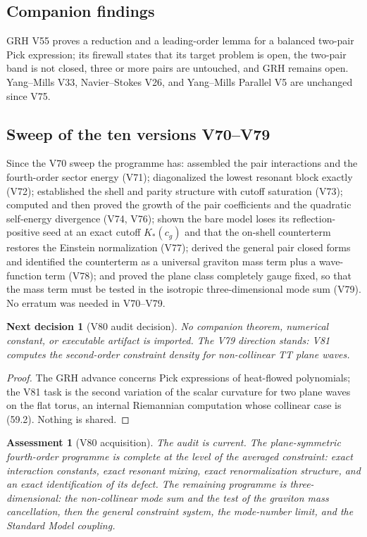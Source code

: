 \documentclass[11pt]{article}
\newtheorem{decision}[theorem]{Next decision}
\newtheorem{assessment}[theorem]{Assessment}
\theoremstyle{remark}
\begin{document}
\subsection{Companion findings}

GRH V55 proves a reduction and a leading-order lemma for a balanced
two-pair Pick expression; its firewall states that its target problem
is open, the two-pair band is not closed, three or more pairs are
untouched, and GRH remains open.  Yang--Mills V33, Navier--Stokes V26,
and Yang--Mills Parallel V5 are unchanged since V75.

\subsection{Sweep of the ten versions V70--V79}

Since the V70 sweep the programme has: assembled the pair interactions
and the fourth-order sector energy (V71); diagonalized the lowest
resonant block exactly (V72); established the shell and parity
structure with cutoff saturation (V73); computed and then proved the
growth of the pair coefficients and the quadratic self-energy
divergence (V74, V76); shown the bare model loses its
reflection-positive seed at an exact cutoff \(K_*(c_g)\) and that the
on-shell counterterm restores the Einstein normalization (V77); derived
the general pair closed forms and identified the counterterm as a
universal graviton mass term plus a wave-function term (V78); and
proved the plane class completely gauge fixed, so that the mass term
must be tested in the isotropic three-dimensional mode sum (V79).  No
erratum was needed in V70--V79.

\begin{decision}[V80 audit decision]
\label{dec:v19v80-audit}
No companion theorem, numerical constant, or executable artifact is
imported.  The V79 direction stands: V81 computes the second-order
constraint density for non-collinear TT plane waves.
\end{decision}

\begin{proof}
The GRH advance concerns Pick expressions of heat-flowed polynomials;
the V81 task is the second variation of the scalar curvature for two
plane waves on the flat torus, an internal Riemannian computation
whose collinear case is (59.2).  Nothing is shared.
\end{proof}

\begin{assessment}[V80 acquisition]
\label{ass:v19v80}
The audit is current.  The plane-symmetric fourth-order programme is
complete at the level of the averaged constraint: exact interaction
constants, exact resonant mixing, exact renormalization structure, and
an exact identification of its defect.  The remaining programme is
three-dimensional: the non-collinear mode sum and the test of the
graviton mass cancellation, then the general constraint system, the
mode-number limit, and the Standard Model coupling.
\end{assessment}
\end{document}
